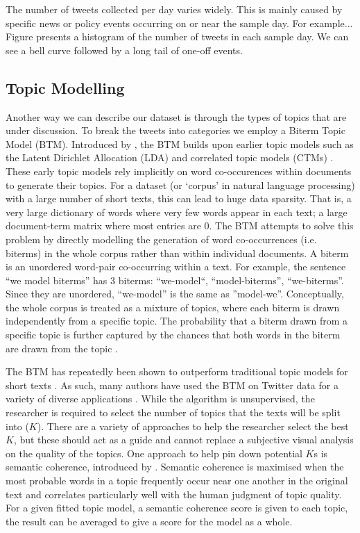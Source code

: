 \documentclass[11pt]{article}
\begin{document}
The number of tweets collected per day varies widely. This is mainly caused by specific news or policy events occurring on or near the sample day. For example... Figure presents a histogram of the number of tweets in each sample day. We can see a bell curve followed by a long tail of one-off events.

\subsection{Topic Modelling} \label{Subsection: Topic Modelling}

Another way we can describe our dataset is through the types of topics that are under discussion. To break the tweets into categories we employ a Biterm Topic Model (BTM). Introduced by \cite{yan2013biterm}, the BTM builds upon earlier topic models such as the Latent Dirichlet Allocation (LDA) \citep{blei2003latent} and correlated topic models (CTMs) \citep{blei2006correlated}. These early topic models rely implicitly on word co-occurences within documents to generate their topics. For a dataset (or `corpus' in natural language processing) with a large number of short texts, this can lead to huge data sparsity. That is, a very large dictionary of words where very few words appear in each text; a large document-term matrix where most entries are 0. The BTM attempts to solve this problem by directly modelling the generation of word co-occurrences (i.e. biterms) in the whole corpus rather than within individual documents. A biterm is an unordered word-pair co-occurring within a text. For example, the sentence ``we model biterms'' has 3 biterms: ``we-model``, ``model-biterms'', ``we-biterms''. Since they are unordered, ``we-model'' is the same as ''model-we''. Conceptually, the whole corpus is treated as a mixture of topics, where each biterm is drawn independently from a specific topic. The probability that a biterm drawn from a specific topic is further captured by the chances that both words in the biterm are drawn from the topic \citep{yan2013biterm}.

The BTM has repeatedly been shown to outperform traditional topic models for short texts \citep{yan2013biterm, jonsson2015evaluation, chen2015user}. As such, many authors have used the BTM on Twitter data for a variety of diverse applications \citep[to name a few]{mackey2018solution, han2016exploratory, khan2021twitter}. While the algorithm is unsupervised, the researcher is required to select the number of topics that the texts will be split into ($K$). There are a variety of approaches to help the researcher select the best $K$, but these should act as a guide and cannot replace a subjective visual analysis on the quality of the topics. One approach to help pin down potential $K$s is semantic coherence, introduced by \cite{mimno2011optimizing}. Semantic coherence is maximised when the most probable words in a topic frequently occur near one another in the original text and correlates particularly well with the human judgment of topic quality. For a given fitted topic model, a semantic coherence score is given to each topic, the result can be averaged to give a score for the model as a whole.
\end{document}
